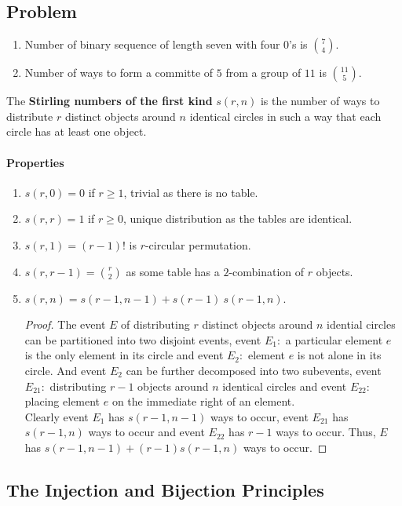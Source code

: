 \subsection*{Problem}
\begin{enumerate}
	\item Number of binary sequence of length seven with four $0$'s is $\binom{7}{4}$.
	\item Number of ways to form a committe of $5$ from a group of $11$ is $\binom{11}{5}$.
\end{enumerate}
\begin{definition}
	The \textbf{Stirling numbers of the first kind} $s(r,n)$ is the number of ways to distribute $r$ distinct objects around $n$ identical circles in such a way that each circle has at least one object.
\end{definition}
\paragraph{Properties}
\begin{enumerate}
	\item $s(r,0) = 0$ if $r \ge 1$, trivial as there is no table.
	\item $s(r,r) = 1$ if $r \ge 0$, unique distribution as the tables are identical.
	\item $s(r,1) = (r-1)!$ is $r$-circular permutation.
	\item $s(r,r-1) = \binom{r}{2}$ as some table has a $2$-combination of $r$ objects.
	\item $s(r,n) = s(r-1,n-1)+s(r-1)\ s(r-1,n)$.
	\begin{proof}
		The event $E$ of distributing $r$ distinct objects around $n$ idential circles can be partitioned into two disjoint events, event $E_1 :$ a particular element $e$ is the only element in its circle and event $E_2 :$ element $e$ is not alone in its circle. And event $E_2$ can be further decomposed into two subevents, event $E_{21} :$ distributing $r-1$ objects around $n$ identical circles and event $E_{22} :$ placing element $e$ on the immediate right of an element.\\

		Clearly event $E_1$ has $s(r-1,n-1)$ ways to occur, event $E_{21}$ has $s(r-1,n)$ ways to occur and event $E_{22}$ has $r-1$ ways to occur. Thus, $E$ has $s(r-1,n-1) + (r-1) s(r-1,n)$ ways to occur.
	\end{proof}
\end{enumerate}
\subsection{The Injection and Bijection Principles}
